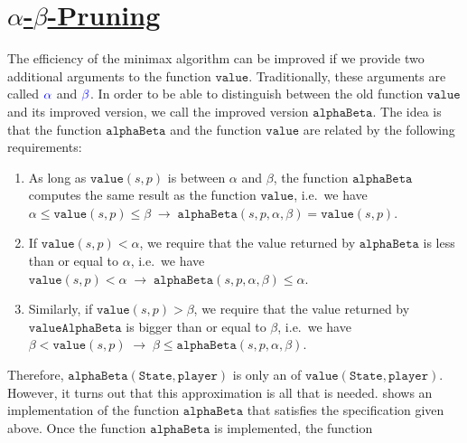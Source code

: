 \section{\href{https://en.wikipedia.org/wiki/Alpha-beta_pruning}{$\alpha$-$\beta$-Pruning}}
The efficiency of the minimax algorithm can be improved if we provide two additional arguments to the function
$\texttt{value}$.  Traditionally, these arguments are called ${\color{blue}\alpha}$ and ${\color{blue}\beta}$.  In order to be able to
distinguish between the old function $\texttt{value}$ and its improved version, we call the improved version 
$\texttt{alphaBeta}$.  The idea is that the function $\texttt{alphaBeta}$ and the function $\texttt{value}$ are
related by the following requirements: 
\begin{enumerate}
\item As long as $\texttt{value}(s, p)$ is between $\alpha$ and $\beta$, the function
      $\texttt{alphaBeta}$ computes the same result as the function $\texttt{value}$,
      i.e.~we have
      \\[0.2cm]
      \hspace*{0.3cm}
      $\alpha \leq \texttt{value}(s, p) \leq \beta \;\rightarrow\;
         \texttt{alphaBeta}(s, p, \alpha, \beta) = \texttt{value}(s,p)
      $.
\item If $\texttt{value}(s, p) < \alpha$, we require that the value returned by
      $\texttt{alphaBeta}$ is less than or equal to $\alpha$, i.e.~we have 
      \\[0.2cm]
      \hspace*{0.3cm}
      $\texttt{value}(s, p) < \alpha \;\rightarrow\; \texttt{alphaBeta}(s, p, \alpha, \beta) \leq \alpha$.
\item Similarly, if $\texttt{value}(s, p) > \beta$, we require that the value
      returned by $\texttt{valueAlphaBeta}$ is bigger than or equal to $\beta$, i.e.~we have 
      \\[0.2cm]
      \hspace*{0.3cm}
      $\beta < \texttt{value}(s, p) \;\rightarrow\; \beta \leq \texttt{alphaBeta}(s, p, \alpha, \beta)$.
\end{enumerate}
Therefore, $\texttt{alphaBeta}(\texttt{State}, \texttt{player})$  is only an  of
$\texttt{value}(\texttt{State}, \texttt{player})$.  However, it turns out that this approximation is all that
is needed.   shows an implementation of the function $\texttt{alphaBeta}$ that
satisfies the specification given above.  Once the function $\texttt{alphaBeta}$ is implemented, the function
